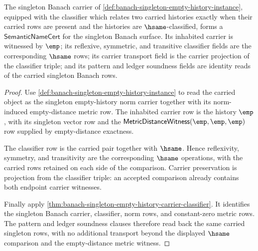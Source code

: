 \begin{theorem}
\label{thm:banach-singleton-carrier-semantic-namecert}
The singleton Banach carrier of
\autoref{def:banach-singleton-empty-history-instance}, equipped with the
classifier which relates two carried histories exactly when their carried
rows are present and the histories are $\hsame$-classified, forms a
$\mathsf{SemanticNameCert}$ for the singleton Banach surface. Its inhabited
carrier is witnessed by $\emp$; its reflexive, symmetric, and transitive
classifier fields are the corresponding $\hsame$ rows; its carrier transport
field is the carrier projection of the classifier triple; and its pattern and
ledger soundness fields are identity reads of the carried singleton Banach
rows.
\end{theorem}
\begin{proof}
Use \autoref{def:banach-singleton-empty-history-instance} to read the carried
object as the singleton empty-history norm carrier together with its
norm-induced empty-distance metric row. The inhabited carrier row is the
history $\emp$, with its singleton vector row and the
$\mathsf{MetricDistanceWitness}(\emp,\emp,\emp)$ row supplied by empty-distance
exactness.

The classifier row is the carried pair together with $\hsame$. Hence
reflexivity, symmetry, and transitivity are the corresponding $\hsame$
operations, with the carried rows retained on each side of the comparison.
Carrier preservation is projection from the classifier triple: an accepted
comparison already contains both endpoint carrier witnesses.

Finally apply
\autoref{thm:banach-singleton-empty-history-carrier-classifier}. It identifies
the singleton Banach carrier, classifier, norm rows, and constant-zero metric
rows. The pattern and ledger soundness clauses therefore read back the same
carried singleton rows, with no additional transport beyond the displayed
$\hsame$ comparison and the empty-distance metric witness.
\end{proof}

